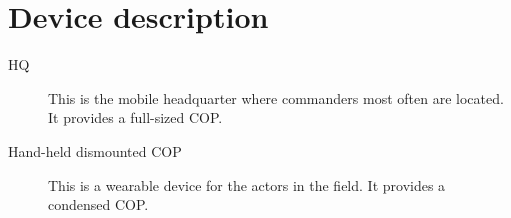 \section{Device description}

\begin{description}
  \item[HQ] This is the mobile headquarter where commanders most often are located. It provides a full-sized COP.
  \item[Hand-held dismounted COP] This is a wearable device for the actors in the field. It provides a condensed COP.
\end{description}